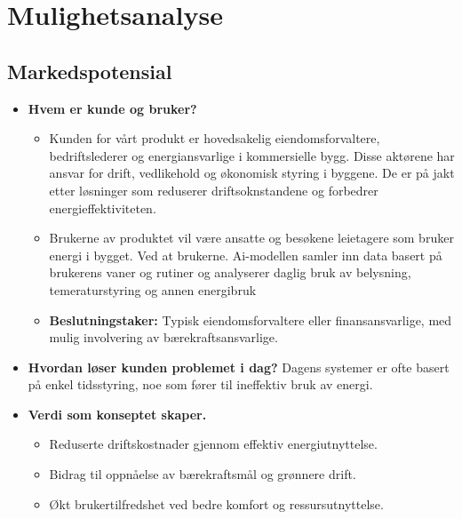 \section{Mulighetsanalyse}
\subsection*{Markedspotensial}
\begin{itemize}


    \item \textbf{Hvem er kunde og bruker?} 

    \begin{itemize}
        \item Kunden for vårt produkt er hovedsakelig eiendomsforvaltere, bedriftslederer og energiansvarlige i kommersielle bygg. Disse aktørene har ansvar for drift, vedlikehold og økonomisk styring i byggene. De er på jakt etter løsninger som reduserer driftsoknstandene og forbedrer energieffektiviteten.
        
        
        \item Brukerne av produktet vil være ansatte og besøkene leietagere som bruker energi i bygget. Ved at brukerne. Ai-modellen samler inn data basert på brukerens vaner og rutiner og analyserer daglig bruk av belysning, temeraturstyring og annen energibruk 
        \item \textbf{Beslutningstaker:} Typisk eiendomsforvaltere eller finansansvarlige, med mulig involvering av bærekraftsansvarlige.
    \end{itemize}

    \item \textbf{Hvordan løser kunden problemet i dag?} 
    Dagens systemer er ofte basert på enkel tidsstyring, noe som fører til ineffektiv bruk av energi.

    \item \textbf{Verdi som konseptet skaper.} 
    \begin{itemize}
        \item Reduserte driftskostnader gjennom effektiv energiutnyttelse.
        \item Bidrag til oppnåelse av bærekraftsmål og grønnere drift.
        \item Økt brukertilfredshet ved bedre komfort og ressursutnyttelse.
    \end{itemize}


\end{itemize}
